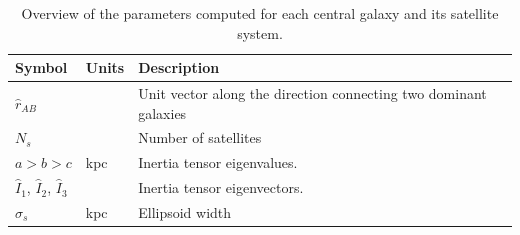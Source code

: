 \documentclass[a4paper,fleqn,usenatbib]{mnras}
\begin{document}
\begin{table}
  \centering
\begin{tabular}{lll}
\hline\hline
Symbol & Units & Description\\\hline
$\hat{r}_{AB}$& & Unit vector along the direction connecting two
dominant galaxies\\
$N_s$ & & Number of satellites\\
$a > b> c$ & kpc & Inertia tensor eigenvalues. \\
$\hat{I}_1$, $\hat{I}_2$, $\hat{I}_3$ & & Inertia tensor eigenvectors. \\
$\sigma_s$ & kpc & Ellipsoid width\\
\hline\hline
\end{tabular}
  \caption{Overview of the parameters computed for each central galaxy
    and its satellite system.
  \label{tab:models}}
\end{table}








\end{document}

